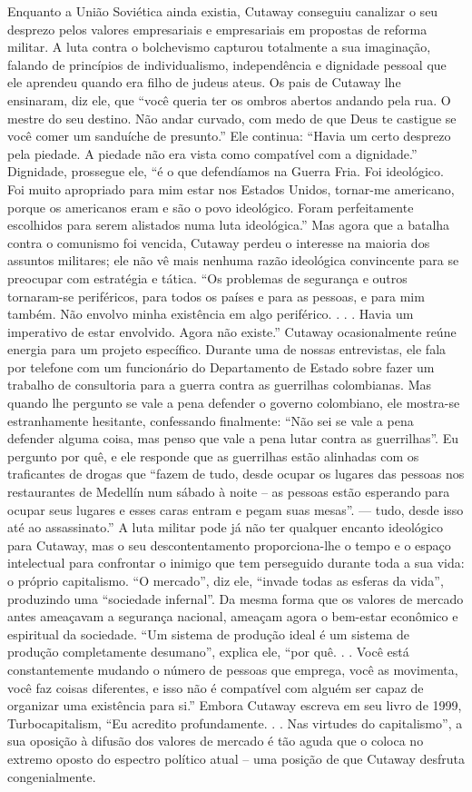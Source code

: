 Enquanto a União Soviética ainda existia, Cutaway conseguiu canalizar o seu desprezo pelos valores empresariais e empresariais em propostas de reforma militar. A luta contra o bolchevismo capturou totalmente a sua imaginação, falando de princípios de individualismo, independência e dignidade pessoal que ele aprendeu quando era filho de judeus ateus. Os pais de Cutaway lhe ensinaram, diz ele, que “você queria ter os ombros abertos andando pela rua. O mestre do seu destino. Não andar curvado, com medo de que Deus te castigue se você comer um sanduíche de presunto.” Ele continua: “Havia um certo desprezo pela piedade. A piedade não era vista como compatível com a dignidade.” Dignidade, prossegue ele, “é o que defendíamos na Guerra Fria. Foi ideológico. Foi muito apropriado para mim estar nos Estados Unidos, tornar-me americano, porque os americanos eram e são o povo ideológico. Foram perfeitamente escolhidos para serem alistados numa luta ideológica.” Mas agora que a batalha contra o comunismo foi vencida, Cutaway perdeu o interesse na maioria dos assuntos militares; ele não vê mais nenhuma razão ideológica convincente para se preocupar com estratégia e tática. “Os problemas de segurança e outros tornaram-se periféricos, para todos os países e para as pessoas, e para mim também. Não envolvo minha existência em algo periférico. . . . Havia um imperativo de estar envolvido. Agora não existe.” Cutaway ocasionalmente reúne energia para um projeto específico. Durante uma de nossas entrevistas, ele fala por telefone com um funcionário do Departamento de Estado sobre fazer um trabalho de consultoria para a guerra contra as guerrilhas colombianas. Mas quando lhe pergunto se vale a pena defender o governo colombiano, ele mostra-se estranhamente hesitante, confessando finalmente: “Não sei se vale a pena defender alguma coisa, mas penso que vale a pena lutar contra as guerrilhas”. Eu pergunto por quê, e ele responde que as guerrilhas estão alinhadas com os traficantes de drogas que “fazem de tudo, desde ocupar os lugares das pessoas nos restaurantes de Medellín num sábado à noite – as pessoas estão esperando para ocupar seus lugares e esses caras entram e pegam suas mesas”. — tudo, desde isso até ao assassinato.” A luta militar pode já não ter qualquer encanto ideológico para Cutaway, mas o seu descontentamento proporciona-lhe o tempo e o espaço intelectual para confrontar o inimigo que tem perseguido durante toda a sua vida: o próprio capitalismo. “O mercado”, diz ele, “invade todas as esferas da vida”, produzindo uma “sociedade infernal”. Da mesma forma que os valores de mercado antes ameaçavam a segurança nacional, ameaçam agora o bem-estar econômico e espiritual da sociedade. “Um sistema de produção ideal é um sistema de produção completamente desumano”, explica ele, “por quê. . . Você está constantemente mudando o número de pessoas que emprega, você as movimenta, você faz coisas diferentes, e isso não é compatível com alguém ser capaz de organizar uma existência para si.” Embora Cutaway escreva em seu livro de 1999, Turbocapitalism, “Eu acredito profundamente. . . Nas virtudes do capitalismo”, a sua oposição à difusão dos valores de mercado é tão aguda que o coloca no extremo oposto do espectro político atual – uma posição de que Cutaway desfruta congenialmente.
